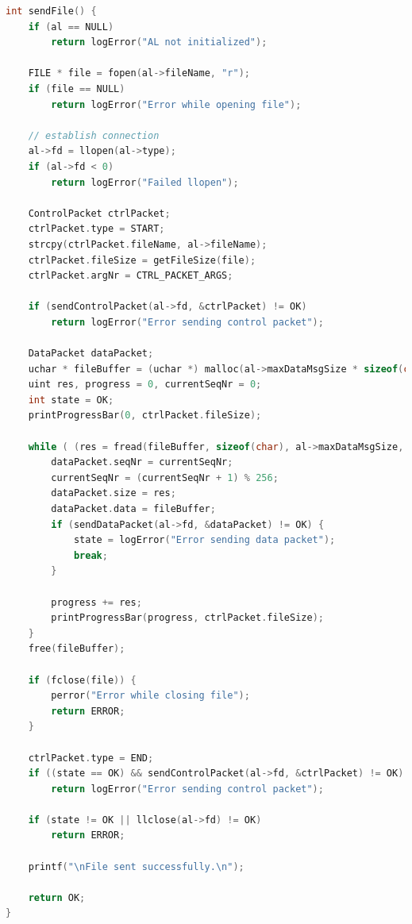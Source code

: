 \documentclass[a4paper, 11pt]{article}
\begin{document}
\begin{lstlisting}[caption = sendFile, language=C]
int sendFile() {
	if (al == NULL)
		return logError("AL not initialized");

	FILE * file = fopen(al->fileName, "r");
	if (file == NULL)
		return logError("Error while opening file");

	// establish connection
	al->fd = llopen(al->type);
	if (al->fd < 0)
		return logError("Failed llopen");

	ControlPacket ctrlPacket;
	ctrlPacket.type = START;
	strcpy(ctrlPacket.fileName, al->fileName);
	ctrlPacket.fileSize = getFileSize(file);
	ctrlPacket.argNr = CTRL_PACKET_ARGS;

	if (sendControlPacket(al->fd, &ctrlPacket) != OK)
		return logError("Error sending control packet");

	DataPacket dataPacket;
	uchar * fileBuffer = (uchar *) malloc(al->maxDataMsgSize * sizeof(char));
	uint res, progress = 0, currentSeqNr = 0;
	int state = OK;
	printProgressBar(0, ctrlPacket.fileSize);
	
	while ( (res = fread(fileBuffer, sizeof(char), al->maxDataMsgSize, file)) > 0 ) {
		dataPacket.seqNr = currentSeqNr;
		currentSeqNr = (currentSeqNr + 1) % 256;
		dataPacket.size = res;
		dataPacket.data = fileBuffer;
		if (sendDataPacket(al->fd, &dataPacket) != OK) {
			state = logError("Error sending data packet");
			break;
		}

		progress += res;
		printProgressBar(progress, ctrlPacket.fileSize);
	}
	free(fileBuffer);

	if (fclose(file)) {
		perror("Error while closing file");
		return ERROR;
	}

	ctrlPacket.type = END;
	if ((state == OK) && sendControlPacket(al->fd, &ctrlPacket) != OK)
		return logError("Error sending control packet");

	if (state != OK || llclose(al->fd) != OK)
		return ERROR;

	printf("\nFile sent successfully.\n");

	return OK;
}
\end{lstlisting}
\end{document}
